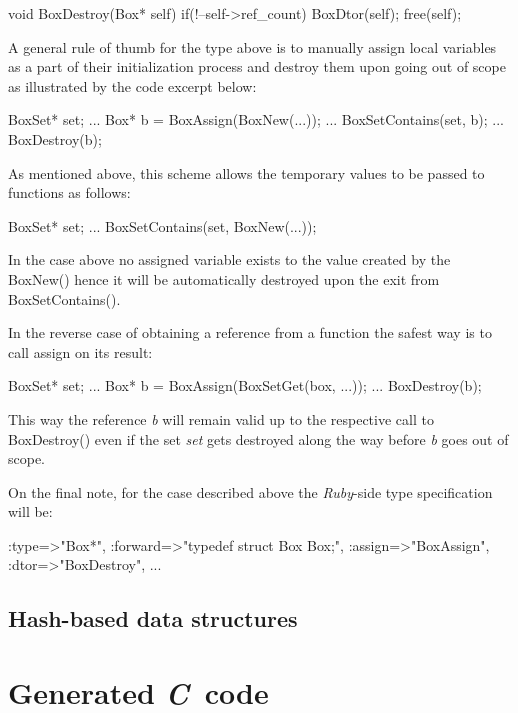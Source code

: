 \documentclass[a4paper]{article}
\newcommand{\R}{\emph{Ruby}}
\newcommand{\C}{\emph{C}}
\newcommand{\meth}[1]{#1}
\begin{document}
\begin{cs}
void BoxDestroy(Box* self) {
	if(!--self->ref_count) {
		BoxDtor(self);
		free(self);
	}
}
\end{cs}


A general rule of thumb for the type above is to manually assign local variables as a part of their initialization process and destroy them upon going out of scope as illustrated by the code excerpt below:


\begin{cs}
BoxSet* set;
...
{
	Box* b = BoxAssign(BoxNew(...));
	...
	BoxSetContains(set, b);
	...
	BoxDestroy(b);
}
\end{cs}


As mentioned above, this scheme allows the temporary values to be passed to functions as follows:


\begin{cs}
BoxSet* set;
...
BoxSetContains(set, BoxNew(...));
\end{cs}


In the case above no assigned variable exists to the value created by the \meth{BoxNew()} hence it will be automatically destroyed upon the exit from \meth{BoxSetContains()}.


In the reverse case of obtaining a reference from a function the safest way is to call assign on its result:
\begin{cs}
BoxSet* set;
...
{
	Box* b = BoxAssign(BoxSetGet(box, ...));
	...
	BoxDestroy(b);
}
\end{cs}


This way the reference \emph{b} will remain valid up to the respective call to \meth{BoxDestroy()} even if the set \emph{set} gets destroyed along the way before \emph{b} goes out of scope.


On the final note, for the case described above the \R-side type specification will be:


\begin{rs}
{
	:type=>"Box*",
	:forward=>"typedef struct Box Box;",
	:assign=>"BoxAssign",
	:dtor=>"BoxDestroy",
	...
}
\end{rs}


\subsection{Hash-based data structures}


\section{Generated \C\ code}
\end{document}
